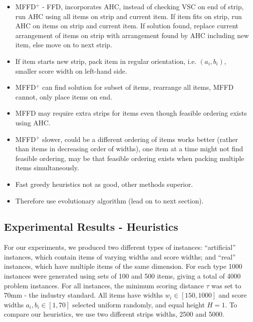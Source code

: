\documentclass{elsarticle}
\begin{document}
{\begin{itemize}
	\item MFFD$^+$ - FFD, incorporates AHC, instead of checking VSC on end of strip, run AHC using all items on strip and current item. If item fits on strip, run AHC on items on strip and current item. If solution found, replace current arrangement of items on strip with arrangement found by AHC including new item, else move on to next strip.
	\item If item starts new strip, pack item in regular orientation, i.e. $(a_i, b_i)$, smaller score width on left-hand side.
	\item MFFD$^+$ can find solution for subset of items, rearrange all items, MFFD cannot, only place items on end.
	\item MFFD may require extra strips for items even though feasible ordering exists using AHC.
	\item MFFD$^+$ slower, could be a different ordering of items works better (rather than items in decreasing order of widths), one item at a time might not find feasible ordering, may be that feasible ordering exists when packing multiple items simultaneously.
	\item Fast greedy heuristics not as good, other methods superior.
	\item Therefore use evolutionary algorithm (lead on to next section).
\end{itemize}
}


\subsection{Experimental Results - Heuristics}
\label{sub:expheuristics}
For our experiments, we produced two different types of instances: ``artificial'' instances, which contain items of varying widths and score widths; and ``real'' instances, which have multiple items of the same dimension. For each type 1000 instances were generated using sets of 100 and 500 items, giving a total of 4000 problem instances. For all instances, the minimum scoring distance $\tau$ was set to 70mm - the industry standard. All items have widths $w_i \in [150,1000]$ and score widths $a_i, b_i \in [1,70]$ selected uniform randomly, and equal height $H=1$. To compare our heuristics, we use two different strips widths, 2500 and 5000.
\end{document}
